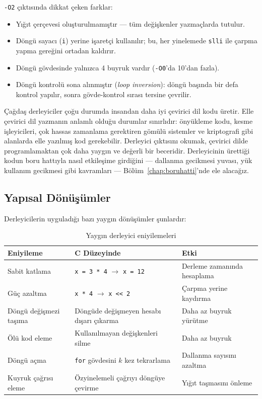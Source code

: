 \begin{ornek}[4.16]
\texttt{-O2} çıktısında dikkat çeken farklar:
\begin{itemize}
\item Yığıt çerçevesi oluşturulmamıştır --- tüm değişkenler yazmaçlarda tutulur.
\item Döngü sayacı (\texttt{i}) yerine işaretçi kullanılır; bu, her yinelemede \texttt{slli} ile çarpma yapma gereğini ortadan kaldırır.
\item Döngü gövdesinde yalnızca 4 buyruk vardır (\texttt{-O0}'da 10'dan fazla).
\item Döngü kontrolü sona alınmıştır (\emph{loop inversion}): döngü başında bir defa kontrol yapılır, sonra gövde-kontrol sırası tersine çevrilir.
\end{itemize}
\end{ornek}

\begin{bilginot}
Çağdaş derleyiciler çoğu durumda insandan daha iyi çevirici dil kodu üretir. Elle çevirici dil yazmanın anlamlı olduğu durumlar sınırlıdır: önyükleme kodu, kesme işleyicileri, çok hassas zamanlama gerektiren gömülü sistemler ve kriptografi gibi alanlarda elle yazılmış kod gerekebilir. Derleyici çıktısını okumak, çevirici dilde programlamaktan çok daha yaygın ve değerli bir beceridir. Derleyicinin ürettiği kodun boru hattıyla nasıl etkileşime girdiğini --- dallanma gecikmesi yuvası, yük kullanım gecikmesi gibi kavramları --- Bölüm~\ref{chap:boruhatti}'nde ele alacağız.
\end{bilginot}


\subsection{Yapısal Dönüşümler}
\label{subsec:yapisal-donusumler}

Derleyicilerin uyguladığı bazı yaygın dönüşümler şunlardır:

\begin{table}[H]
\centering
\caption[Yaygın derleyici eniyilemeleri]{Yaygın derleyici eniyilemeleri}
\label{tab:derleyici-eniyilemeleri}
\small
\begin{tabularx}{\textwidth}{l X X}
\toprule
\textbf{Eniyileme} & \textbf{C Düzeyinde} & \textbf{Etki} \\
\midrule
Sabit katlama & \texttt{x = 3 * 4} $\rightarrow$ \texttt{x = 12} & Derleme zamanında hesaplama \\
Güç azaltma & \texttt{x * 4} $\rightarrow$ \texttt{x << 2} & Çarpma yerine kaydırma \\
Döngü değişmezi taşıma & Döngüde değişmeyen hesabı dışarı çıkarma & Daha az buyruk yürütme \\
Ölü kod eleme & Kullanılmayan değişkenleri silme & Daha az buyruk \\
Döngü açma & \texttt{for} gövdesini $k$ kez tekrarlama & Dallanma sayısını azaltma \\
Kuyruk çağrısı eleme & Özyinelemeli çağrıyı döngüye çevirme & Yığıt taşmasını önleme \\
\bottomrule
\end{tabularx}
\end{table}


